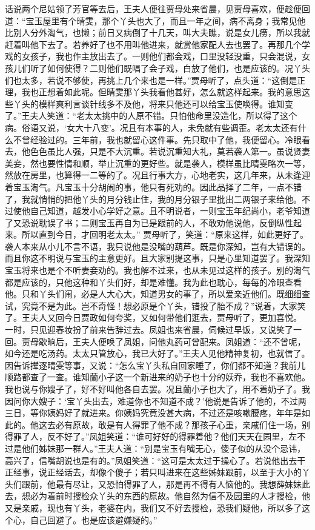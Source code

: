 \documentclass[12pt,oneside]{book}
\begin{document}
话说两个尼姑领了芳官等去后，王夫人便往贾母处来省晨，见贾母喜欢，便趁便回道：“宝玉屋里有个晴雯，那个丫头也大了，而且一年之间，病不离身；我常见他比别人分外淘气，也懒；前日又病倒了十几天，叫大夫瞧，说是女儿痨，所以我就赶着叫他下去了。若养好了也不用叫他进来，就赏他家配人去也罢了。再那几个学戏的女孩子，我也作主放出去了。一则他们都会戏，口里没轻没重，只会混说，女孩儿们听了如何使得？二则他们既唱了会子戏，白放了他们，也是应该的。况丫头们也太多，若说不够使，再挑上几个来也是一样。”贾母听了，点头道：“这倒是正理，我也正想着如此呢。但晴雯那丫头我看他甚好，怎么就这样起来。我的意思这些丫头的模样爽利言谈针线多不及他，将来只他还可以给宝玉使唤得。谁知变了。”王夫人笑道：“老太太挑中的人原不错。只怕他命里没造化，所以得了这个病。俗语又说，‘女大十八变’。况且有本事的人，未免就有些调歪。老太太还有什么不曾经验过的。三年前，我也就留心这件事。先只取中了他，我便留心。冷眼看去，他色色虽比人强，只是不大沉重。若说沉重知大礼，莫若袭人第一。虽说贤妻美妾，然也要性情和顺，举止沉重的更好些。就是袭人，模样虽比晴雯略次一等，然放在房里，也算得一二等的了。况且行事大方，心地老实，这几年来，从未逢迎着宝玉淘气。凡宝玉十分胡闹的事，他只有死劝的。因此品择了二年，一点不错了，我就悄悄的把他丫头的月分钱止住，我的月分银子里批出二两银子来给他。不过使他自己知道，越发小心学好之意。且不明说者，一则宝玉年纪尚小，老爷知道了又恐说耽误了书；二则宝玉再自为已是跟前的人，不敢劝他说他，反倒纵性起来。所以直到今日，才回明老太太。”
贾母听了，笑道：“原来这样，如此更好了。袭人本来从小儿不言不语，我只说他是没嘴的葫芦。既是你深知，岂有大错误的。而且你这不明说与宝玉的主意更好。且大家别提这事，只是心里知道罢了。我深知宝玉将来也是个不听妻妾劝的。我也解不过来，也从未见过这样的孩子。别的淘气都是应该的，只他这种和丫头们好，却是难懂。我为此也耽心，每每的冷眼查看他。只和丫头们闹，必是人大心大，知道男女的事了，所以爱亲近他们。既细细查试，究竟不是为此。岂不奇怪！想必原是个丫头，错投了胎不成？”说着，大家笑了。王夫人又回今日贾政如何夸奖，又如何带他们逛去，贾母听了，更加喜悦。
一时，只见迎春妆扮了前来告辞过去。凤姐也来省晨，伺候过早饭，又说笑了一回。贾母歇晌后，王夫人便唤了凤姐，问他丸药可曾配来。凤姐道：“还不曾呢，如今还是吃汤药。太太只管放心，我已大好了。”王夫人见他精神复初，也就信了。因告诉撵逐晴雯等事，又说：“怎么宝丫头私自回家睡了，你们都不知道？我前儿顺路都查了一查。谁知蘭小子这一个新进来的奶子也十分的妖乔，我也不喜欢他。我也说与你嫂子了，好不好叫他各自去罢。况且蘭小子也大了，用不着奶子了。我因问你大嫂子：‘宝丫头出去，难道你也不知道不成？’他说是告诉了他的，不过两三日，等你姨妈好了就进来。你姨妈究竟没甚大病，不过还是咳嗽腰疼，年年是如此的。他这去必有原故，敢是有人得罪了他不成？那孩子心重，亲戚们住一场，别得罪了人，反不好了。”凤姐笑道：“谁可好好的得罪着他？他们天天在园里，左不过是他们姊妹那一群人。”王夫人道：“别是宝玉有嘴无心，傻子似的从没个忌讳，高兴了，信嘴胡说也是有的。”凤姐笑道：“这可是太太过于操心了。若说他出去干正经事，说正经话去，却像个傻子；若只叫进来在这些姊妹跟前，以至于大小的丫头们跟前，他最有尽让，又恐怕得罪了人，那是再不得有人恼他的。我想薛妹妹此去，想必为着前时搜检众丫头的东西的原故。他自然为信不及园里的人才搜检，他又是亲戚，现也有丫头，老婆在内，我们又不好去搜检，恐我们疑他，所以多了这个心，自己回避了。也是应该避嫌疑的。”
\end{document}
